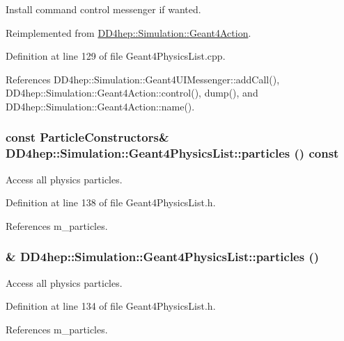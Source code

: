 Install command control messenger if wanted. 

Reimplemented from \hyperlink{class_d_d4hep_1_1_simulation_1_1_geant4_action_aaaa0718b7d4f52e4c31e982b91c0eeda}{DD4hep::Simulation::Geant4Action}.

Definition at line 129 of file Geant4PhysicsList.cpp.

References DD4hep::Simulation::Geant4UIMessenger::addCall(), DD4hep::Simulation::Geant4Action::control(), dump(), and DD4hep::Simulation::Geant4Action::name().\hypertarget{class_d_d4hep_1_1_simulation_1_1_geant4_physics_list_aa145cac6ebeb2a51d34df83762f612e1}{
\subsubsection[{particles}]{\setlength{\rightskip}{0pt plus 5cm}const {\bf ParticleConstructors}\& DD4hep::Simulation::Geant4PhysicsList::particles () const}}
\label{class_d_d4hep_1_1_simulation_1_1_geant4_physics_list_aa145cac6ebeb2a51d34df83762f612e1}


Access all physics particles. 

Definition at line 138 of file Geant4PhysicsList.h.

References m\_\-particles.\hypertarget{class_d_d4hep_1_1_simulation_1_1_geant4_physics_list_a273a6db05b6ea5a2b9a8a2491fbd2d7a}{
\subsubsection[{particles}]{\& DD4hep::Simulation::Geant4PhysicsList::particles ()}}
\label{class_d_d4hep_1_1_simulation_1_1_geant4_physics_list_a273a6db05b6ea5a2b9a8a2491fbd2d7a}


Access all physics particles. 

Definition at line 134 of file Geant4PhysicsList.h.

References m\_\-particles.

